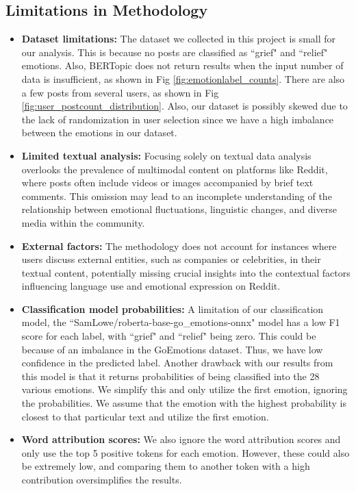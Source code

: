\documentclass[conference,compsoc]{IEEEtran}
\begin{document}
\subsection{Limitations in Methodology}
\begin{itemize}
    \item \textbf{Dataset limitations:} The dataset we collected in this project is small for our analysis. This is because no posts are classified as ``grief" and ``relief" emotions. Also, BERTopic does not return results when the input number of data is insufficient, as shown in Fig \ref{fig:emotionlabel_counts}. There are also a few posts from several users, as shown in Fig \ref{fig:user_postcount_distribution}. Also, our dataset is possibly skewed due to the lack of randomization in user selection since we have a high imbalance between the emotions in our dataset.
    \item \textbf{Limited textual analysis:} Focusing solely on textual data analysis overlooks the prevalence of multimodal content on platforms like Reddit, where posts often include videos or images accompanied by brief text comments. This omission may lead to an incomplete understanding of the relationship between emotional fluctuations, linguistic changes, and diverse media within the community.
    \item \textbf{External factors:} The methodology does not account for instances where users discuss external entities, such as companies or celebrities, in their textual content, potentially missing crucial insights into the contextual factors influencing language use and emotional expression on Reddit. 
    \item \textbf{Classification model probabilities:} A limitation of our classification model, the ``SamLowe/roberta-base-go\_emotions-onnx" model has a low F1 score for each label, with ``grief" and ``relief" being zero. This could be because of an imbalance in the GoEmotions dataset. Thus, we have low confidence in the predicted label.
    Another drawback with our results from this model is that it returns probabilities of being classified into the 28 various emotions. We simplify this and only utilize the first emotion, ignoring the probabilities. We assume that the emotion with the highest probability is closest to that particular text and utilize the first emotion.
    \item \textbf{Word attribution scores:} We also ignore the word attribution scores and only use the top 5 positive tokens for each emotion. However, these could also be extremely low, and comparing them to another token with a high contribution oversimplifies the results. 
\end{itemize}
\end{document}
